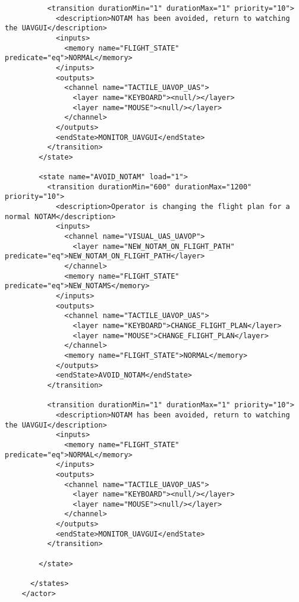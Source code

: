 \begin{verbatim}
          <transition durationMin="1" durationMax="1" priority="10">
            <description>NOTAM has been avoided, return to watching the UAVGUI</description>
            <inputs>
              <memory name="FLIGHT_STATE" predicate="eq">NORMAL</memory>
            </inputs>
            <outputs>
              <channel name="TACTILE_UAVOP_UAS">
                <layer name="KEYBOARD"><null/></layer>
                <layer name="MOUSE"><null/></layer>
              </channel>
            </outputs>
            <endState>MONITOR_UAVGUI</endState>
          </transition>
        </state>
        
        <state name="AVOID_NOTAM" load="1">
          <transition durationMin="600" durationMax="1200" priority="10">
            <description>Operator is changing the flight plan for a normal NOTAM</description>
            <inputs>
              <channel name="VISUAL_UAS_UAVOP">
                <layer name="NEW_NOTAM_ON_FLIGHT_PATH" predicate="eq">NEW_NOTAM_ON_FLIGHT_PATH</layer>
              </channel>
              <memory name="FLIGHT_STATE" predicate="eq">NEW_NOTAMS</memory>
            </inputs>
            <outputs>
              <channel name="TACTILE_UAVOP_UAS">
                <layer name="KEYBOARD">CHANGE_FLIGHT_PLAN</layer>
                <layer name="MOUSE">CHANGE_FLIGHT_PLAN</layer>
              </channel>
              <memory name="FLIGHT_STATE">NORMAL</memory>
            </outputs>
            <endState>AVOID_NOTAM</endState>
          </transition>
          
          <transition durationMin="1" durationMax="1" priority="10">
            <description>NOTAM has been avoided, return to watching the UAVGUI</description>
            <inputs>
              <memory name="FLIGHT_STATE" predicate="eq">NORMAL</memory>
            </inputs>
            <outputs>
              <channel name="TACTILE_UAVOP_UAS">
                <layer name="KEYBOARD"><null/></layer>
                <layer name="MOUSE"><null/></layer>
              </channel>
            </outputs>
            <endState>MONITOR_UAVGUI</endState>
          </transition>
          
        </state>
                                   
      </states>
    </actor>
\end{verbatim}
